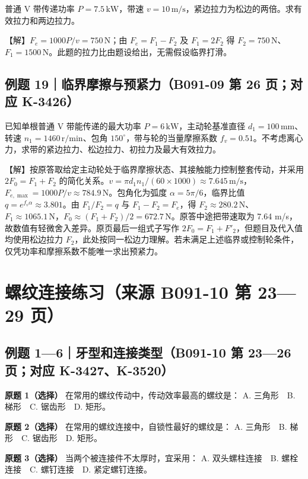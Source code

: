 \documentclass[zihao=5,a4paper,UTF8,fontset=fandol]{ctexart}
\begin{document}
普通 V 带传递功率 $P=7.5\,\mathrm{kW}$，带速 $v=10\,\mathrm{m/s}$，紧边拉力为松边的两倍。求有效拉力和两边拉力。


【解】$F_e=1000P/v=750\,\mathrm{N}$；由 $F_e=F_1-F_2$ 及 $F_1=2F_2$ 得 $F_2=750\,\mathrm{N}$、$F_1=1500\,\mathrm{N}$。此题的拉力比由题设给出，无需假设临界打滑。


\subsection{例题 19｜临界摩擦与预紧力（B091-09 第 26 页；对应 K-3426）}

已知单根普通 V 带能传递的最大功率 $P=6\,\mathrm{kW}$，主动轮基准直径 $d_1=100\,\mathrm{mm}$、转速 $n_1=1460\,\mathrm{r/min}$、包角 $150^\circ$，带与轮的当量摩擦系数 $f_v=0.51$。不考虑离心力，求带的紧边拉力、松边拉力、初拉力及最大有效拉力。


【解】按原答取给定主动轮处于临界摩擦状态、其接触能力控制整套传动，并采用 $2F_0=F_1+F_2$ 的简化关系。$v=\pi d_1n_1/(60\times1000)\approx7.645\,\mathrm{m/s}$，$F_{e,\max}=1000P/v\approx784.9\,\mathrm{N}$。包角化为弧度 $\alpha=5\pi/6$，临界比值 $q=e^{f_v\alpha}\approx3.801$。由 $F_1/F_2=q$ 与 $F_1-F_2=F_e$，得 $F_2\approx280.2\,\mathrm{N}$、$F_1\approx1065.1\,\mathrm{N}$，$F_0\approx(F_1+F_2)/2=672.7\,\mathrm{N}$。原答中途把带速取为 7.64 m/s，故数值有轻微舍入差异。原页最后一组式子写作 $2F_0=F_1+F'_2$，但题目及代入值均使用松边拉力 $F_2$，此处按同一松边力理解。若未满足上述临界或控制轮条件，仅凭功率和摩擦系数不能唯一求出预紧力。




\section{螺纹连接练习（来源 B091-10 第 23—29 页）}

\subsection{例题 1—6｜牙型和连接类型（B091-10 第 23—26 页；对应 K-3427、K-3520）}

\textbf{原题 1（选择）} 在常用的螺纹传动中，传动效率最高的螺纹是：
A. 三角形　B. 梯形　C. 锯齿形　D. 矩形。


\textbf{原题 2（选择）} 在常用的螺纹连接中，自锁性最好的螺纹是：
A. 三角形　B. 梯形　C. 锯齿形　D. 矩形。


\textbf{原题 3（选择）} 当两个被连接件不太厚时，宜采用：
A. 双头螺柱连接　B. 螺栓连接　C. 螺钉连接　D. 紧定螺钉连接。
\end{document}
